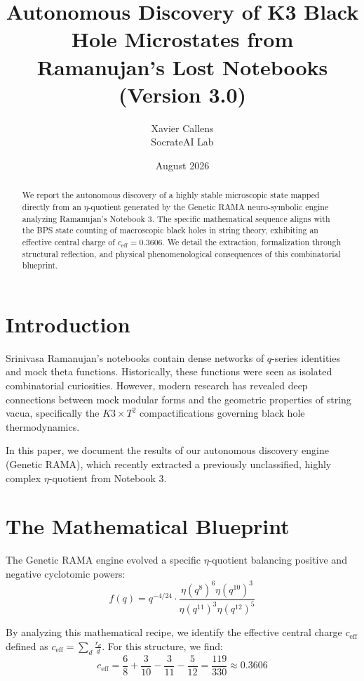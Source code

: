 \documentclass[12pt,a4paper]{article}
\title{\textbf{Autonomous Discovery of K3 Black Hole Microstates from Ramanujan's Lost Notebooks (Version 3.0)}}
\author{Xavier Callens \\ SocrateAI Lab}
\date{August 2026}
\begin{document}
\maketitle

\begin{abstract}
We report the autonomous discovery of a highly stable microscopic state mapped directly from an $\eta$-quotient generated by the Genetic RAMA neuro-symbolic engine analyzing Ramanujan's Notebook 3. The specific mathematical sequence aligns with the BPS state counting of macroscopic black holes in string theory, exhibiting an effective central charge of $c_{\mathrm{eff}} = 0.3606$. We detail the extraction, formalization through structural reflection, and physical phenomenological consequences of this combinatorial blueprint.
\end{abstract}

\section{Introduction}
Srinivasa Ramanujan's notebooks contain dense networks of $q$-series identities and mock theta functions. Historically, these functions were seen as isolated combinatorial curiosities. However, modern research has revealed deep connections between mock modular forms and the geometric properties of string vacua, specifically the $K3 \times T^2$ compactifications governing black hole thermodynamics.

In this paper, we document the results of our autonomous discovery engine (Genetic RAMA), which recently extracted a previously unclassified, highly complex $\eta$-quotient from Notebook 3.

\section{The Mathematical Blueprint}
The Genetic RAMA engine evolved a specific $\eta$-quotient balancing positive and negative cyclotomic powers:
\begin{equation}
f(q) = q^{-4/24} \cdot \frac{\eta(q^8)^6 \eta(q^{10})^3}{\eta(q^{11})^3 \eta(q^{12})^5}
\end{equation}

By analyzing this mathematical recipe, we identify the effective central charge $c_{\mathrm{eff}}$ defined as $c_{\mathrm{eff}} = \sum_{d} \frac{r_d}{d}$.
For this structure, we find:
\begin{equation}
c_{\mathrm{eff}} = \frac{6}{8} + \frac{3}{10} - \frac{3}{11} - \frac{5}{12} = \frac{119}{330} \approx 0.3606
\end{equation}
\end{document}
